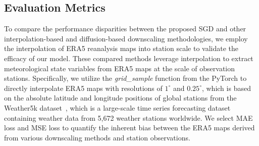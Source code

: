 \subsection{Evaluation Metrics}
To compare the performance disparities between the proposed SGD and other interpolation-based and diffusion-based downscaling methodologies, we employ the interpolation of ERA5 reanalysis maps into station scale to validate the efficacy of our model. 
These compared methods leverage interpolation to extract meteorological state variables from ERA5 maps at the scale of observation stations. 
Specifically, we utilize the \textit{grid\_sample} function from the PyTorch to directly interpolate ERA5 maps with resolutions of $1^{\circ}$ and $0.25^{\circ}$, which is based on the absolute latitude and longitude positions of global stations from the Weather5k dataset~\cite{han2024weather}, which is a large-scale time series forecasting dataset containing weather data from 5,672 weather stations worldwide.  
We select MAE loss and MSE loss to quantify the inherent bias between the ERA5 maps derived from various downscaling methods and station observations. 

